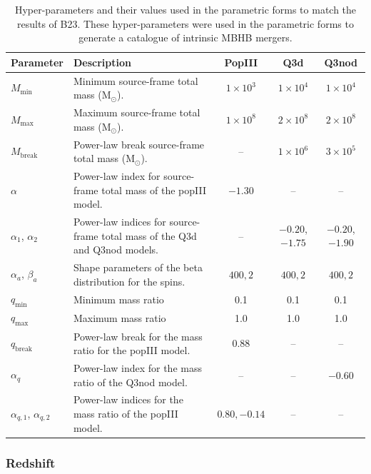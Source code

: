 \documentclass[a4paper,12pt]{article}
\begin{document}
\begin{table}[!htbp]
\captionsetup{font=footnotesize}
\centering
\caption{Hyper-parameters and their values used in the parametric forms to match the results of B23. These hyper-parameters were used in the parametric forms to generate a catalogue of intrinsic MBHB mergers.}
\footnotesize
\setlength{\tabcolsep}{4pt}
\renewcommand\arraystretch{1.12}
\begin{tabular}{@{} l p{5.6cm} c c c @{}}
\toprule
Parameter & Description & PopIII & Q3d & Q3nod \\
\midrule
$M_{\min}$ & Minimum source-frame total mass ($\mathrm{M}_{\odot}$). & $1\times10^{3}$ & $1\times10^{4}$ & $1\times10^{4}$ \\
$M_{\max}$ & Maximum source-frame total mass ($\mathrm{M}_{\odot}$). & $1\times10^{8}$ & $2\times10^{8}$ & $2\times10^{8}$ \\
$M_{\mathrm{break}}$ & Power-law break source-frame total mass ($\mathrm{M}_{\odot}$). & -- & $1\times10^{6}$ & $3\times10^{5}$ \\
$\alpha$ & Power-law index for source-frame total mass of the popIII model. & $-1.30$ & -- & -- \\
$\alpha_{1}$, $\alpha_{2}$ & Power-law indices for source-frame total mass of the Q3d and Q3nod models. & -- & $-0.20$,$-1.75$ & $-0.20$,$-1.90$ \\
$\alpha_{a}$, $\beta_{a}$ & Shape parameters of the beta distribution for the spins. & $400,2$ & $400,2$ & $400,2$ \\
$q_{\min}$ & Minimum mass ratio & 0.1 & 0.1 & 0.1 \\
$q_{\max}$ & Maximum mass ratio & 1.0 & 1.0 & 1.0 \\
$q_{\mathrm{break}}$ & Power-law break for the mass ratio for the popIII model. & 0.88 & -- & -- \\
$\alpha_{q}$ & Power-law index for the mass ratio of the Q3nod model. & -- & -- & $-0.60$ \\
$\alpha_{q,1}$, $\alpha_{q,2}$ & Power-law indices for the mass ratio of the popIII model. & $0.80,-0.14$ & -- & -- \\
\bottomrule
\end{tabular}
\label{tab:hyper-parameters_values}
\end{table}

\FloatBarrier
\subsubsection{Redshift}
\end{document}
